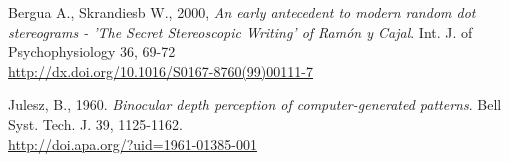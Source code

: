 \begin{thebibliography}{12}
Bergua A., Skrandiesb W., 2000, {\it An early antecedent to modern random dot stereograms - 'The Secret Stereoscopic Writing’ of Ram\'on y Cajal}. Int. J. of Psychophysiology 36, 69-72\\
\url{http://dx.doi.org/10.1016/S0167-8760(99)00111-7}

Julesz, B., 1960. {\it Binocular depth perception of computer-generated patterns}. Bell Syst. Tech. J. 39, 1125-1162.\\
\url{http://doi.apa.org/?uid=1961-01385-001}
\end{thebibliography}